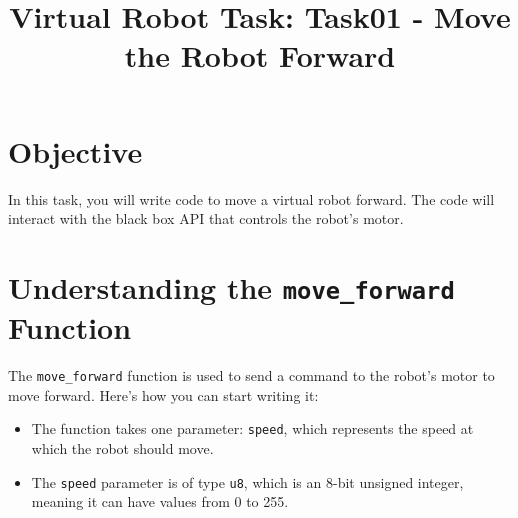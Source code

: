 \documentclass[12pt]{article}
\title{Virtual Robot Task: Task01 - Move the Robot Forward}
\author{}
\date{}
\begin{document}
	
	\maketitle
	
	\section*{Objective}
	In this task, you will write code to move a virtual robot forward. The code will interact with the black box API that controls the robot's motor.
	
	\section*{Understanding the \texttt{move\_forward} Function}
	The \texttt{move\_forward} function is used to send a command to the robot’s motor to move forward. Here’s how you can start writing it:
	\begin{itemize}
		\item The function takes one parameter: \texttt{speed}, which represents the speed at which the robot should move.
		\item The \texttt{speed} parameter is of type \texttt{u8}, which is an 8-bit unsigned integer, meaning it can have values from 0 to 255.
	\end{itemize}
	
\end{document}
